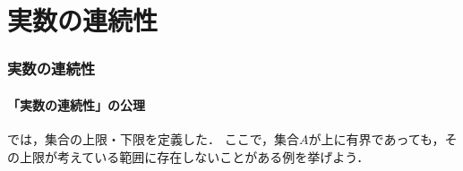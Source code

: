 \part{実数の連続性}

\begin{abstract}
この章では，実数全体の集合を特徴づける性質である「実数の連続性」を導入し，それを用いていくつかの基本的な命題を証明する．では，$\varepsilon$--$N$論法を用いて実数列の収束を厳密に定義した．しかし，有理数列$a_n = (1+1/n)^n$が有理数の範囲に極限をもたないように，「数列の行き先」がつねにその集合の中に存在するかどうかは，極限の定義とは別の議論を必要とする．$\mathbb{R}$において数列が「隙間」に落ち込むことなく極限をもちうるのは，「実数の連続性」を公理として認めているからにほかならない．まず，有理数の範囲では上限が存在しない場合があることを具体例で確認する．次に，「実数の連続性」の公理を導入し，これを用いて単調収束定理を証明する．最後に，高校数学でも扱った$\lim_{n \to \infty} 1/n = 0$という直感的な事実を支える「アルキメデスの原理」が，この公理からどのように導かれるのかをみよう．
\end{abstract}

\draftpart

\section{実数の連続性}

\subsection{「実数の連続性」の公理}

では，集合の上限・下限を定義した．
ここで，集合$A$が上に有界であっても，その上限が考えている範囲に存在しないことがある例を挙げよう．

